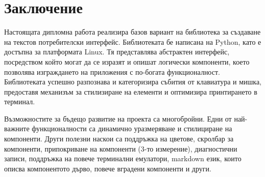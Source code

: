 \chapter{Заключение}

Настоящата дипломна работа реализира базов вариант на библиотека за създаване 
на текстов потребителски интерфейс. Библиотеката бе написана на Python, като
е достъпна за платформата Linux. Тя представлява абстрактен интерфейс, 
посредством който могат да се изразят и опишат логически компоненти, което
позволява изграждането на приложения с по-богата функционалност. Библиотеката
успешно разпознава и категоризира събития от клавиатура и мишка, предоставя
механизъм за стилизиране на елементи и оптимизира принтирането в терминал.

Възможностите за бъдещо развитие на проекта са многобройни. Едни от най-важните
функционалности са динамично уразмеряване и стилициране на компоненти. 
Други полезни наскои са поддръжка на цветове, скролбар за компоненти, 
припокриване на компоненти (3-то измерение), диагностични записи, поддръжка на 
повече терминални емулатори, markdown език, които описва компонентото дърво,
повече вградени компоненти и други.
